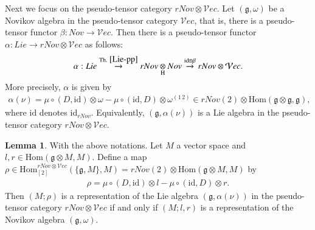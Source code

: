 \documentclass[12pt]{amsart}
\theoremstyle{definition}
\newtheorem{lem}[thm]{Lemma}
\newcommand{\g}{\mathfrak g}
\newcommand{\id}{\mathrm{id}}
\newcommand{\Hom}{\mathrm{Hom}}
\newcommand{\ot}{\otimes}
\newcommand{\cc}{\circ}
\begin{document}
Next we focus on the pseudo-tensor category $rNov\ot \mathcal{V}ec$. Let $(\g,\omega)$ be a Novikov algebra in the pseudo-tensor category $\mathcal{V}ec$, that is, there is a pseudo-tensor functor $\beta:Nov\to \mathcal{V}ec$. Then there is a pseudo-tensor functor $\alpha:Lie\to rNov\ot\mathcal{V}ec$ as follows:
\begin{align*}
\alpha:	Lie\overset{{\rm Th.}~ \ref{Lie-pp}}{\to} rNov\underset{\rm H}{\ot} Nov\overset{\id\ot\beta}{\to} rNov\ot\mathcal{V}ec.
\end{align*}
More precisely, $\alpha$ is given by
\begin{align}\label{def-coeff-nu}
\alpha(\nu)=\mu\cc(D,\id)\ot \omega-\mu\cc(\id, D)\ot\omega^{(1\,2)}\in rNov(2)\otimes \Hom(\g\ot\g,\g),
\end{align}
where $\id$ denotes  $\id_{rNov}$.
Equivalently, $(\g,\alpha(\nu))$ is a Lie algebra in the pseudo-tensor category $rNov\otimes\mathcal{V}ec$.
\begin{lem}\label{Nov-to-Lie}
With the above notations. Let $M$ a vector space and $l,r\in \Hom(\g\ot M, M)$. Define a map $\rho\in\Hom_{[2]}^{rNov\ot\mathcal{V}ec}(\{\g,M\},M)=rNov(2)\ot\Hom(\g\ot M,M)$  by
\begin{align}\label{def-rho}
	\rho=\mu\cc(D,\id)\ot l-\mu\cc(\id,D)\ot r.
\end{align}
Then $(M;\rho)$ is a representation of the Lie algebra $(\g,\alpha(\nu))$ in the pseudo-tensor category $rNov\ot\mathcal{V}ec$ if and only if $(M;l,r)$ is a representation of the Novikov algebra $(\g,\omega)$.
\end{lem}
\end{document}
